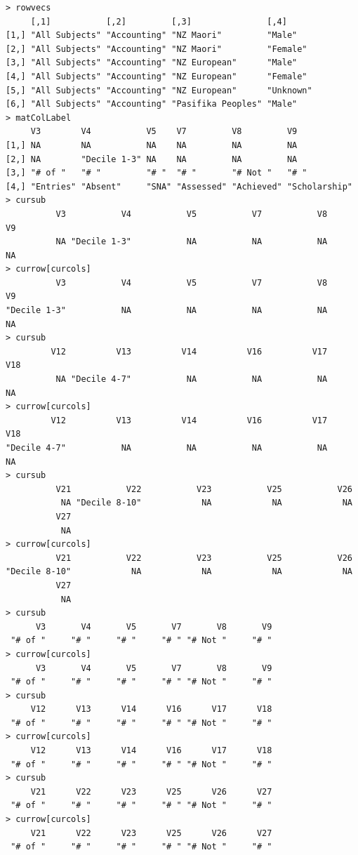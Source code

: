 \documentclass[a4paper]{article}
\begin{document}
\begin{verbatim}
> rowvecs 
     [,1]           [,2]         [,3]               [,4]     
[1,] "All Subjects" "Accounting" "NZ Maori"         "Male"   
[2,] "All Subjects" "Accounting" "NZ Maori"         "Female" 
[3,] "All Subjects" "Accounting" "NZ European"      "Male"   
[4,] "All Subjects" "Accounting" "NZ European"      "Female" 
[5,] "All Subjects" "Accounting" "NZ European"      "Unknown"
[6,] "All Subjects" "Accounting" "Pasifika Peoples" "Male"   
> matColLabel 
     V3        V4           V5    V7         V8         V9           
[1,] NA        NA           NA    NA         NA         NA           
[2,] NA        "Decile 1-3" NA    NA         NA         NA           
[3,] "# of "   "# "         "# "  "# "       "# Not "   "# "         
[4,] "Entries" "Absent"     "SNA" "Assessed" "Achieved" "Scholarship"
> cursub 
          V3           V4           V5           V7           V8           V9 
          NA "Decile 1-3"           NA           NA           NA           NA 
> currow[curcols] 
          V3           V4           V5           V7           V8           V9 
"Decile 1-3"           NA           NA           NA           NA           NA 
> cursub 
         V12          V13          V14          V16          V17          V18 
          NA "Decile 4-7"           NA           NA           NA           NA 
> currow[curcols] 
         V12          V13          V14          V16          V17          V18 
"Decile 4-7"           NA           NA           NA           NA           NA 
> cursub 
          V21           V22           V23           V25           V26 
           NA "Decile 8-10"            NA            NA            NA 
          V27 
           NA 
> currow[curcols] 
          V21           V22           V23           V25           V26 
"Decile 8-10"            NA            NA            NA            NA 
          V27 
           NA 
> cursub 
      V3       V4       V5       V7       V8       V9 
 "# of "     "# "     "# "     "# " "# Not "     "# " 
> currow[curcols] 
      V3       V4       V5       V7       V8       V9 
 "# of "     "# "     "# "     "# " "# Not "     "# " 
> cursub 
     V12      V13      V14      V16      V17      V18 
 "# of "     "# "     "# "     "# " "# Not "     "# " 
> currow[curcols] 
     V12      V13      V14      V16      V17      V18 
 "# of "     "# "     "# "     "# " "# Not "     "# " 
> cursub 
     V21      V22      V23      V25      V26      V27 
 "# of "     "# "     "# "     "# " "# Not "     "# " 
> currow[curcols] 
     V21      V22      V23      V25      V26      V27 
 "# of "     "# "     "# "     "# " "# Not "     "# " 

\end{verbatim}
\end{document}
